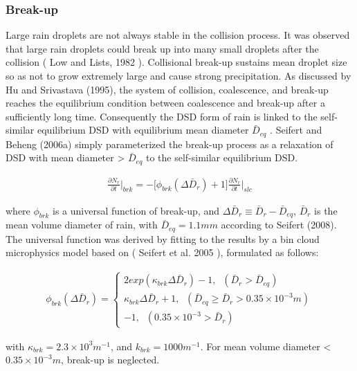 \subsubsection{Break-up}
Large rain droplets are not always stable in the collision process. It was observed that large rain droplets could break up into many small droplets after the collision ( Low and Lists, 1982 ). Collisional break-up sustains mean droplet size so as not to grow extremely large and cause strong precipitation. As discussed by Hu and Srivastava (1995), the system of collision, coalescence, and break-up reaches the equilibrium condition between coalescence and break-up after a sufficiently long time. Consequently the DSD form of rain is linked to the self-similar equilibrium DSD with equilibrium mean diameter $\bar{D}_{eq}$ . Seifert and Beheng (2006a) simply parameterized the break-up process as a relaxation of DSD with mean diameter > $\bar{D}_{eq}$ to the self-similar equilibrium DSD.

\begin{eqnarray}
\frac{\partial N_{r}}{\partial t}\Bigr|_{brk}=-\bigl[\phi_{brk}(\Delta \bar{D}_{r})+1\bigr]\frac{\partial N_{r}}{\partial t}\Bigr|_{slc}\label{sn154}
\end{eqnarray}

where $\phi_{brk}$ is a universal function of break-up, and $\Delta \bar{D}_{r}\equiv \bar{D}_{r}-\bar{D}_{eq}$, $\bar{D}_{r}$ is the mean volume diameter of rain, with $\bar{D}_{eq} = 1.1 mm$ according to Seifert (2008). The universal function was derived by fitting to the results by a bin cloud microphysics model based on ( Seifert et al. 2005 ), formulated as follows:

\begin{eqnarray}
\phi_{brk}(\Delta\bar{D}_{r})=
\left\{
\begin{array}{l}
2exp(\kappa_{brk}\Delta\bar{D}_{r})-1,\;\;(\bar{D}_{r}>\bar{D}_{eq}) \\
\kappa_{brk}\Delta\bar{D}_{r}+1,\;\;(\bar{D}_{eq}\geq \bar{D}_{r}>0.35\times 10^{-3}m) \\
-1,\;\;(0.35\times10^{-3}>\bar{D}_{r})
\label{sn155}
\end{array}
\right.
\end{eqnarray}

with $\kappa_{brk} = 2.3 \times 10^{3} m^{-1}$, and $k_{brk} = 1000 m^{-1}$. For mean volume diameter < $0.35 \times 10^{-3}m$, break-up is neglected.

